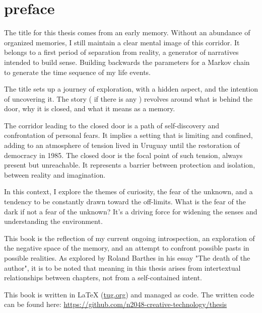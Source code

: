 \chapter*{preface}
\normalsize

The title for this thesis comes from an early memory. Without an abundance of organized memories, I still maintain a clear mental image of this corridor. It belongs to a first period of separation from reality, a generator of narratives intended to build sense. Building backwards the parameters for a Markov chain to generate the time sequence of my life events.    

The title sets up a journey of exploration, with a hidden aspect, and the intention of uncovering it. The story ( if there is any ) {r}evolves around what is behind the door, why it is closed, and what it means as a memory.

The corridor leading to the closed door is a path of self-discovery and confrontation of personal fears. It implies a setting that is limiting and confined, adding to an atmosphere of tension lived in Uruguay until the restoration of democracy in 1985. The closed door is the focal point of such tension, always present but unreachable. It represents a barrier between protection and isolation, between reality and imagination.

In this context, I explore the themes of curiosity, the fear of the unknown, and a tendency to be constantly drawn toward the off-limits. What is the fear of the dark if not a fear of the unknown? It’s a driving force for widening the senses and understanding the environment.

This book is the reflection of my current ongoing introspection, an exploration of the negative space of the memory, and an attempt to confront possible pasts in possible realities. As explored by Roland Barthes in his essay "The death of the author"\citep{barthes1967}, it is to be noted that meaning in this thesis arises from intertextual relationships between chapters, not from a self-contained intent.

This book is written in \LaTeX{} (\href{https://www.tug.org/texlive/quickinstall.html}{tug.org}) and managed as code. The written code can be found here: \href{https://github.com/n2048-creative-technology/thesis}{https://github.com/n2048-creative-technology/thesis} 
